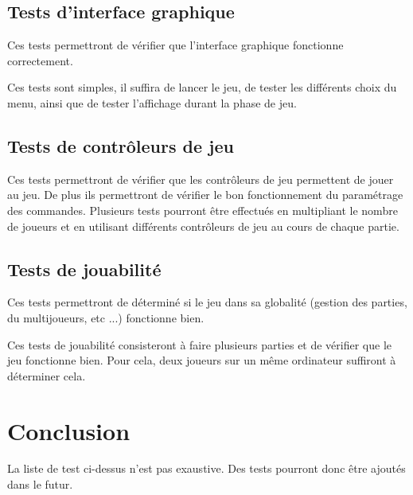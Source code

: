 \subsection{Tests d'interface graphique}

Ces tests permettront de vérifier que l'interface graphique fonctionne correctement.

Ces tests sont simples, il suffira de lancer le jeu, de tester les différents choix du menu, ainsi que de tester l'affichage durant la phase de jeu.

\subsection{Tests de contrôleurs de jeu}

Ces tests permettront de vérifier que les contrôleurs de jeu permettent de jouer au jeu.
De plus ils permettront de vérifier le bon fonctionnement du paramétrage des commandes.
Plusieurs tests pourront être effectués en multipliant le nombre de joueurs et en utilisant différents contrôleurs de jeu au cours de chaque partie.

\subsection{Tests de jouabilité}

Ces tests permettront de déterminé si le jeu dans sa globalité (gestion des parties, du multijoueurs, etc ...) fonctionne bien.

Ces tests de jouabilité consisteront à faire plusieurs parties et de vérifier que le jeu fonctionne bien. Pour cela, deux joueurs sur un même ordinateur suffiront à déterminer cela.

\newpage

\section*{Conclusion}

La liste de test ci-dessus n'est pas exaustive. Des tests pourront donc être ajoutés dans le futur.
